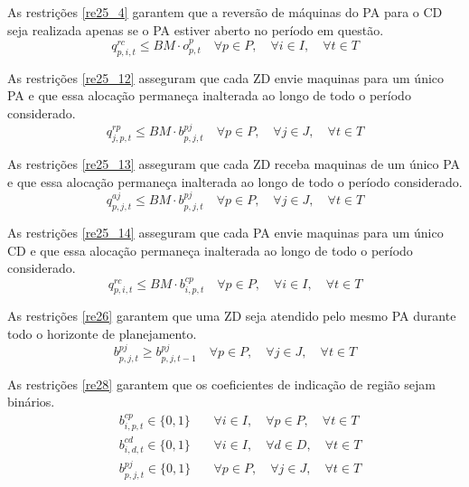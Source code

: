 As restrições \ref{re25_4} garantem que a reversão de máquinas do PA para o CD seja realizada apenas se o PA estiver aberto no período em questão.
\begin{equation}\label{re25_4}
q^{rc}_{p,i,t} \leq BM \cdot o^{p}_{p,t} \quad \forall p \in P, \quad \forall i \in I, \quad \forall t \in T
\end{equation}

As restrições \ref{re25_12} asseguram que cada ZD envie maquinas para um único PA e que essa alocação permaneça inalterada ao longo de todo o período considerado.
\begin{equation}\label{re25_12}
q^{rp}_{j,p,t} \leq BM \cdot b^{pj}_{p,j,t} \quad \forall p \in P, \quad \forall j \in J, \quad \forall t \in T
\end{equation}

As restrições \ref{re25_13} asseguram que cada ZD receba maquinas de um único PA e que essa alocação permaneça inalterada ao longo de todo o período considerado.
\begin{equation}\label{re25_13}
q^{aj}_{p,j,t} \leq BM \cdot b^{pj}_{p,j,t} \quad \forall p \in P, \quad \forall j \in J, \quad \forall t \in T
\end{equation}

As restrições \ref{re25_14} asseguram que cada PA envie maquinas para um único CD e que essa alocação permaneça inalterada ao longo de todo o período considerado.
\begin{equation}\label{re25_14}
q^{rc}_{p,i,t} \leq BM \cdot b^{cp}_{i,p,t} \quad \forall p \in P, \quad \forall i \in I, \quad \forall t \in T
\end{equation}

As restrições \ref{re26} garantem que uma ZD seja atendido pelo mesmo PA durante todo o horizonte de planejamento.
\begin{equation}\label{re26}
b^{pj}_{p,j,t} \geq b^{pj}_{p,j,t-1} \quad \forall p \in P, \quad \forall j \in J, \quad \forall t \in T
\end{equation}

As restrições \ref{re28} garantem que os coeficientes de indicação de região sejam binários.
\begin{equation}\label{re28}
\begin{aligned}
& b^{cp}_{i,p,t} \in \{0,1\} \quad & \forall i \in I, \quad \forall p \in P, \quad \forall t \in T \\
& b^{cd}_{i,d,t} \in \{0,1\} \quad & \forall i \in I, \quad \forall d \in D, \quad \forall t \in T \\
& b^{pj}_{p,j,t} \in \{0,1\} \quad & \forall p \in P, \quad \forall j \in J, \quad \forall t \in T
\end{aligned}
\end{equation}

